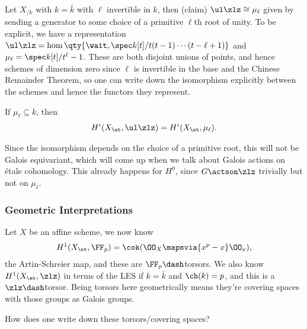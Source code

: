 \begin{example}[?]

Let \(X_{/k}\) with \(k=\bar k\) with \(\ell\) invertible in \(k\), then
(claim) \(\ul \zlz \cong \mu_\ell\) given by sending a generator to some
choice of a primitive \(\ell\)th root of unity. To be explicit, we have
a representation
\(\ul \zlz = \hom \qty{ \wait, \spec k[t] / t(t-1) \cdots (t-\ell+1) }\)
and \(\mu_\ell = \spec k[t] / t^\ell-1\). These are both disjoint unions
of points, and hence schemes of dimension zero since \(\ell\) is
invertible in the base and the Chinese Remainder Theorem, so one can
write down the isomorphism explicitly between the schemes and hence the
functors they represent.

\begin{corollary}[?]

If \(\mu_\ell \subseteq k\), then
\begin{align*}  
H^i(X_\et, \ul\zlz) = 
H^i(X_\et, \mu_\ell)
.\end{align*}

\end{corollary}

Since the isomorphism depends on the choice of a primitive root, this
will not be Galois equivariant, which will come up when we talk about
Galois actions on étale cohomology. This already happens for \(H^0\),
since \(G\actson\zlz\) trivially but not on \(\mu_\ell\).

\end{example}

\hypertarget{geometric-interpretations}{%
\subsubsection{Geometric
Interpretations}\label{geometric-interpretations}}

Let \(X\) be an affine scheme, we now know
\begin{align*}
H^1(X_\et, \FF_p) = \cok(\OO_X \mapsvia{x^p - x} \OO_x)
,\end{align*} the Artin-Schreier map, and these are
\(\FF_p\dash\)torsors. We also know \(H^1(X_\et, \zlz)\) in terms of the
LES if \(k = \bar k\) and \(\ch(k) = p\), and this is a
\(\zlz\dash\)torsor. Being torsors here geometrically means they're
covering spaces with those groups as Galois groups.

\begin{question}

How does one write down these torsors/covering spaces?

\end{question}

